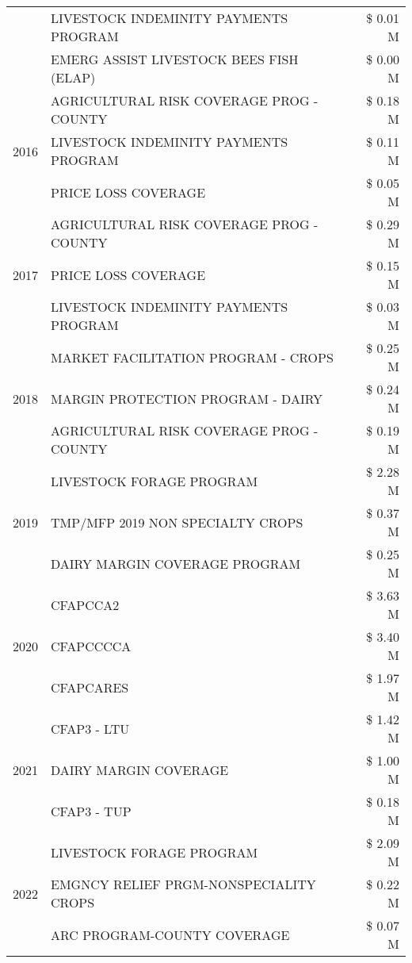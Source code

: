 \begin{tabular}{llr}
 & LIVESTOCK INDEMINITY PAYMENTS PROGRAM & \$ 0.01 M \\
 & EMERG ASSIST LIVESTOCK BEES FISH (ELAP) & \$ 0.00 M \\
\cline{1-3}
\multirow[t]{3}{*}{2016} & AGRICULTURAL RISK COVERAGE PROG - COUNTY & \$ 0.18 M \\
 & LIVESTOCK INDEMINITY PAYMENTS PROGRAM & \$ 0.11 M \\
 & PRICE LOSS COVERAGE & \$ 0.05 M \\
\cline{1-3}
\multirow[t]{3}{*}{2017} & AGRICULTURAL RISK COVERAGE PROG - COUNTY & \$ 0.29 M \\
 & PRICE LOSS COVERAGE & \$ 0.15 M \\
 & LIVESTOCK INDEMINITY PAYMENTS PROGRAM & \$ 0.03 M \\
\cline{1-3}
\multirow[t]{3}{*}{2018} & MARKET FACILITATION PROGRAM - CROPS & \$ 0.25 M \\
 & MARGIN PROTECTION PROGRAM - DAIRY & \$ 0.24 M \\
 & AGRICULTURAL RISK COVERAGE PROG - COUNTY & \$ 0.19 M \\
\cline{1-3}
\multirow[t]{3}{*}{2019} & LIVESTOCK FORAGE PROGRAM & \$ 2.28 M \\
 & TMP/MFP 2019 NON SPECIALTY CROPS & \$ 0.37 M \\
 & DAIRY MARGIN COVERAGE PROGRAM & \$ 0.25 M \\
\cline{1-3}
\multirow[t]{3}{*}{2020} & CFAPCCA2 & \$ 3.63 M \\
 & CFAPCCCCA & \$ 3.40 M \\
 & CFAPCARES & \$ 1.97 M \\
\cline{1-3}
\multirow[t]{3}{*}{2021} & CFAP3 - LTU & \$ 1.42 M \\
 & DAIRY MARGIN COVERAGE & \$ 1.00 M \\
 & CFAP3 - TUP & \$ 0.18 M \\
\cline{1-3}
\multirow[t]{3}{*}{2022} & LIVESTOCK FORAGE PROGRAM & \$ 2.09 M \\
 & EMGNCY RELIEF PRGM-NONSPECIALITY CROPS & \$ 0.22 M \\
 & ARC PROGRAM-COUNTY COVERAGE & \$ 0.07 M \\
\cline{1-3}
\bottomrule
\end{tabular}
